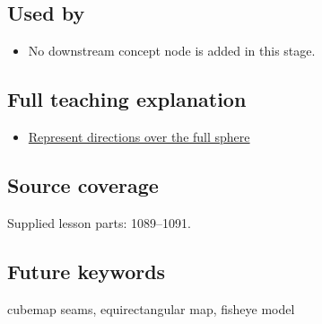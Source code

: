 \subsection{Used by}\label{used-by}

\begin{itemize}
\tightlist
\item
  No downstream concept node is added in this stage.
\end{itemize}

\subsection{Full teaching explanation}\label{full-teaching-explanation}

\begin{itemize}
\tightlist
\item
  \href{Continuous\%20Notes/Computing\%20Foundations\%20-\%20From\%20Bits\%20to\%20C++\%20and\%20Systems\%20APIs\#Represent\%20directions\%20over\%20the\%20full\%20sphere}{Represent directions over the full sphere}
\end{itemize}

\subsection{Source coverage}\label{source-coverage}

Supplied lesson parts: 1089--1091.

\subsection{Future keywords}\label{future-keywords}

cubemap seams, equirectangular map, fisheye model
